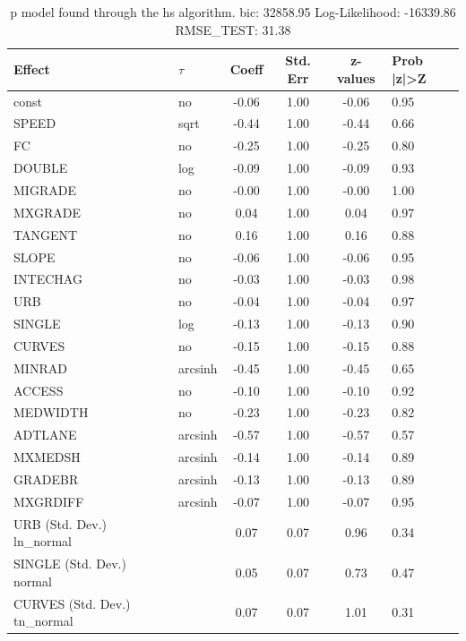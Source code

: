 \begin{table}
	\caption{p model found through the hs algorithm. bic: 32858.95 Log-Likelihood: -16339.86 RMSE_TEST: 31.38}
	\begin{center}
		\begin{tabular}{|l|l|c|c|c|l|}
			\hline
			Effect & $\tau$ & Coeff & Std. Err & z-values & Prob |z|>Z \\
			\hline
			const & no & -0.06 & 1.00 & -0.06 & 0.95 \\
			\hline
			SPEED & sqrt & -0.44 & 1.00 & -0.44 & 0.66 \\
			\hline
			FC & no & -0.25 & 1.00 & -0.25 & 0.80 \\
			\hline
			DOUBLE & log & -0.09 & 1.00 & -0.09 & 0.93 \\
			\hline
			MIGRADE & no & -0.00 & 1.00 & -0.00 & 1.00 \\
			\hline
			MXGRADE & no & 0.04 & 1.00 & 0.04 & 0.97 \\
			\hline
			TANGENT & no & 0.16 & 1.00 & 0.16 & 0.88 \\
			\hline
			SLOPE & no & -0.06 & 1.00 & -0.06 & 0.95 \\
			\hline
			INTECHAG & no & -0.03 & 1.00 & -0.03 & 0.98 \\
			\hline
			URB & no & -0.04 & 1.00 & -0.04 & 0.97 \\
			\hline
			SINGLE & log & -0.13 & 1.00 & -0.13 & 0.90 \\
			\hline
			CURVES & no & -0.15 & 1.00 & -0.15 & 0.88 \\
			\hline
			MINRAD & arcsinh & -0.45 & 1.00 & -0.45 & 0.65 \\
			\hline
			ACCESS & no & -0.10 & 1.00 & -0.10 & 0.92 \\
			\hline
			MEDWIDTH & no & -0.23 & 1.00 & -0.23 & 0.82 \\
			\hline
			ADTLANE & arcsinh & -0.57 & 1.00 & -0.57 & 0.57 \\
			\hline
			MXMEDSH & arcsinh & -0.14 & 1.00 & -0.14 & 0.89 \\
			\hline
			GRADEBR & arcsinh & -0.13 & 1.00 & -0.13 & 0.89 \\
			\hline
			MXGRDIFF & arcsinh & -0.07 & 1.00 & -0.07 & 0.95 \\
			\hline
			URB (Std. Dev.) ln_normal &  & 0.07 & 0.07 & 0.96 & 0.34 \\
			\hline
			SINGLE (Std. Dev.) normal &  & 0.05 & 0.07 & 0.73 & 0.47 \\
			\hline
			CURVES (Std. Dev.) tn_normal &  & 0.07 & 0.07 & 1.01 & 0.31 \\

\end{tabular}
\end{center}
\end{table}
